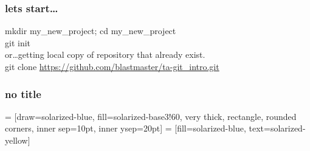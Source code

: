 \begin{frame}
    \frametitle{lets start\ldots}
    mkdir my\_new\_project; cd my\_new\_project \\
    git init \\
    or\ldots getting local copy of repository that already exist.\\
    git clone \url{https://github.com/blastmaster/ta-git\_intro.git}
\end{frame}

\begin{frame}
    \frametitle{no title} %
     = [draw=solarized-blue, fill=solarized-base3!60, very thick,
        rectangle, rounded corners, inner sep=10pt, inner ysep=20pt]
     = [fill=solarized-blue, text=solarized-yellow]
\end{frame}

